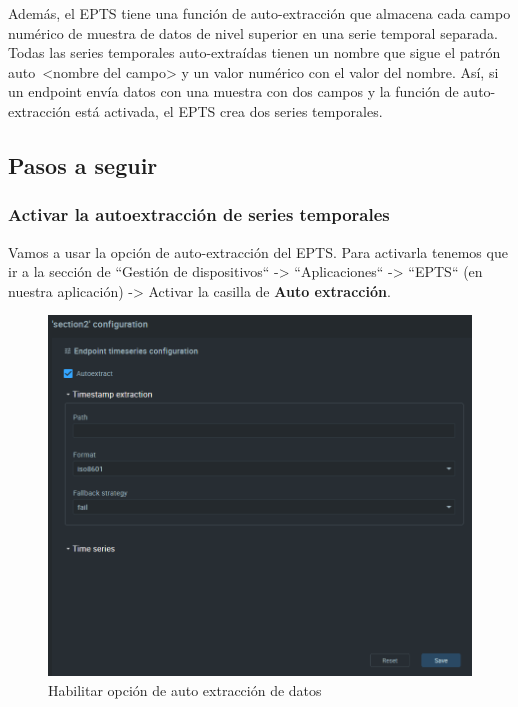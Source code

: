 {Además, el EPTS tiene una función de auto-extracción que almacena cada campo numérico de muestra de datos de nivel superior en una serie temporal separada. Todas las series temporales auto-extraídas tienen un nombre que sigue el patrón auto~<nombre del campo> y un valor numérico con el valor del nombre. Así, si un endpoint envía datos con una muestra con dos campos y la función de auto-extracción está activada, el EPTS crea dos series temporales.

\subsection{Pasos a seguir}

\subsubsection{Activar la autoextracción de series temporales}

Vamos a usar la opción de auto-extracción del EPTS. Para activarla tenemos que ir a la sección de ``Gestión de dispositivos`` -> ``Aplicaciones`` -> ``EPTS`` (en nuestra aplicación) -> Activar la casilla de \textbf{Auto extracción}.\\

\begin{figure}[hb!]
    \centering
    \includegraphics[width=\linewidth]{imagenes/autoextract-option.png}
    \caption{Habilitar opción de auto extracción de datos}
    \label{fig:figure10}
\end{figure}

}
